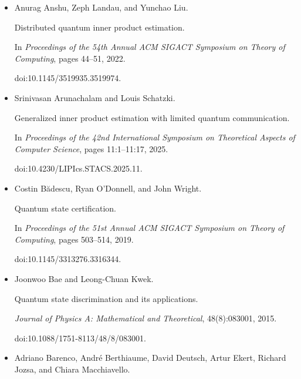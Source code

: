 \begin{itemize}


\item[] 
[1]

Anurag Anshu, Zeph Landau, and Yunchao Liu.


Distributed quantum inner product estimation.


In \emph{Proceedings of the 54th Annual ACM SIGACT Symposium on Theory
of Computing}, pages 44–51, 2022.


doi:10.1145/3519935.3519974.





\item[] 
[2]

Srinivasan Arunachalam and Louis Schatzki.


Generalized inner product estimation with limited quantum
communication.


In \emph{Proceedings of the 42nd International Symposium on
Theoretical Aspects of Computer Science}, pages 11:1–11:17, 2025.


doi:10.4230/LIPIcs.STACS.2025.11.





\item[] 
[3]

Costin Bădescu, Ryan O’Donnell, and John Wright.


Quantum state certification.


In \emph{Proceedings of the 51st Annual ACM SIGACT Symposium on Theory
of Computing}, pages 503–514, 2019.


doi:10.1145/3313276.3316344.





\item[] 
[4]

Joonwoo Bae and Leong-Chuan Kwek.


Quantum state discrimination and its applications.


\emph{Journal of Physics A: Mathematical and Theoretical},
48(8):083001, 2015.


doi:10.1088/1751-8113/48/8/083001.





\item[] 
[5]

Adriano Barenco, André Berthiaume, David Deutsch, Artur Ekert, Richard
Jozsa, and Chiara Macchiavello.



\end{itemize}
